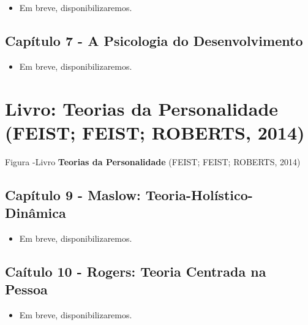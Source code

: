 \documentclass[
]{book}
\providecommand{\tightlist}{%
  \setlength{\itemsep}{0pt}\setlength{\parskip}{0pt}}
\begin{document}
\begin{itemize}
\tightlist
\item
  Em breve, disponibilizaremos.
\end{itemize}

\hypertarget{capuxedtulo-7---a-psicologia-do-desenvolvimento}{%
\subsection{Capítulo 7 - A Psicologia do
Desenvolvimento}\label{capuxedtulo-7---a-psicologia-do-desenvolvimento}}

\begin{itemize}
\tightlist
\item
  Em breve, disponibilizaremos.
\end{itemize}

\hypertarget{livro-teorias-da-personalidade-feist-feist-roberts-2014}{%
\section{\texorpdfstring{Livro: \textbf{Teorias da Personalidade}
(FEIST; FEIST; ROBERTS,
2014)}{Livro: Teorias da Personalidade (FEIST; FEIST; ROBERTS, 2014)}}\label{livro-teorias-da-personalidade-feist-feist-roberts-2014}}

Figura -Livro \textbf{Teorias da Personalidade} (FEIST; FEIST; ROBERTS,
2014)

\hypertarget{capuxedtulo-9---maslow-teoria-holuxedstico-dinuxe2mica}{%
\subsection{Capítulo 9 - Maslow:
Teoria-Holístico-Dinâmica}\label{capuxedtulo-9---maslow-teoria-holuxedstico-dinuxe2mica}}

\begin{itemize}
\tightlist
\item
  Em breve, disponibilizaremos.
\end{itemize}

\hypertarget{cauxedtulo-10---rogers-teoria-centrada-na-pessoa}{%
\subsection{Caítulo 10 - Rogers: Teoria Centrada na
Pessoa}\label{cauxedtulo-10---rogers-teoria-centrada-na-pessoa}}

\begin{itemize}
\tightlist
\item
  Em breve, disponibilizaremos.
\end{itemize}
\end{document}
